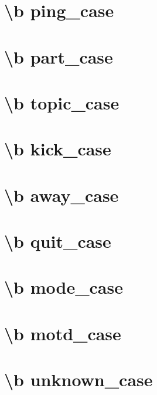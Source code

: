 \documentclass[twoside]{book}
\begin{document}
\chapter{\textbackslash{}b ping\-\_\-case}
\label{ping_case}
\hypertarget{ping_case}{}

\chapter{\textbackslash{}b part\-\_\-case}
\label{part_case}
\hypertarget{part_case}{}

\chapter{\textbackslash{}b topic\-\_\-case}
\label{topic_case}
\hypertarget{topic_case}{}

\chapter{\textbackslash{}b kick\-\_\-case}
\label{kick_case}
\hypertarget{kick_case}{}

\chapter{\textbackslash{}b away\-\_\-case}
\label{away_case}
\hypertarget{away_case}{}

\chapter{\textbackslash{}b quit\-\_\-case}
\label{quit_case}
\hypertarget{quit_case}{}

\chapter{\textbackslash{}b mode\-\_\-case}
\label{mode_case}
\hypertarget{mode_case}{}

\chapter{\textbackslash{}b motd\-\_\-case}
\label{motd_case}
\hypertarget{motd_case}{}

\chapter{\textbackslash{}b unknown\-\_\-case}
\label{unknown_case}
\hypertarget{unknown_case}{}


\newpage
{}
{}
\printindex
\end{document}
